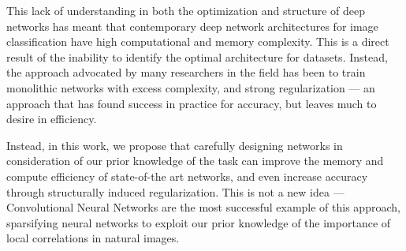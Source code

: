 \documentclass[thesis]{subfiles}
\begin{document}
This lack of understanding in both the optimization and structure of deep networks has meant that contemporary deep network architectures for image classification have high computational and memory complexity. This is a direct result of the inability to identify the optimal architecture for datasets. Instead, the approach advocated by many researchers in the field has been to train monolithic networks with excess complexity, and strong regularization --- an approach that has found success in practice for accuracy, but leaves much to desire in efficiency.


Instead, in this work, we propose that carefully designing networks in consideration of our prior knowledge of the task can improve the memory and compute efficiency of state-of-the art networks, and even increase accuracy through structurally induced regularization. This is not a new idea --- Convolutional Neural Networks are the most successful example of this approach, sparsifying neural networks to exploit our prior knowledge of the importance of local correlations in natural images.
\end{document}

